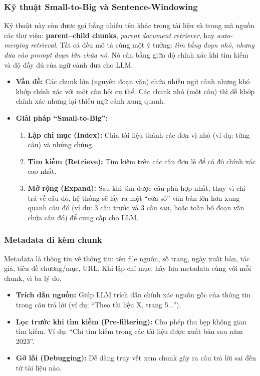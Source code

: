 \subsubsection{Kỹ thuật Small-to-Big và Sentence-Windowing}
\label{sssec:small_to_big}
Kỹ thuật này còn được gọi bằng nhiều tên khác trong tài liệu và trong mã nguồn các thư viện: \textbf{parent--child chunks}, \emph{parent document retriever}, hay \emph{auto-merging retrieval}. Tất cả đều mô tả cùng một ý tưởng: \emph{tìm bằng đoạn nhỏ, nhưng đưa vào prompt đoạn lớn chứa nó}.
Nó cân bằng giữa độ chính xác khi tìm kiếm và độ đầy đủ của ngữ cảnh đưa cho LLM.
\begin{itemize}
	\item \textbf{Vấn đề:} Các chunk lớn (nguyên đoạn văn) chứa nhiều ngữ cảnh nhưng khó khớp chính xác với một câu hỏi cụ thể. Các chunk nhỏ (một câu) thì dễ khớp chính xác nhưng lại thiếu ngữ cảnh xung quanh.
	\item \textbf{Giải pháp “Small-to-Big”:}
	\begin{enumerate}
		\item \textbf{Lập chỉ mục (Index):} Chia tài liệu thành các đơn vị nhỏ (ví dụ: từng câu) và nhúng chúng.
		\item \textbf{Tìm kiếm (Retrieve):} Tìm kiếm trên các câu đơn lẻ để có độ chính xác cao nhất.
		\item \textbf{Mở rộng (Expand):} Sau khi tìm được câu phù hợp nhất, thay vì chỉ trả về câu đó, hệ thống sẽ lấy ra một “cửa sổ” văn bản lớn hơn xung quanh câu đó (ví dụ: 3 câu trước và 3 câu sau, hoặc toàn bộ đoạn văn chứa câu đó) để cung cấp cho LLM.
	\end{enumerate}
\end{itemize}

\subsubsection{Metadata đi kèm chunk}
Metadata là thông tin về thông tin: tên file nguồn, số trang, ngày xuất bản, tác giả, tiêu đề chương/mục, URL. Khi lập chỉ mục, hãy lưu metadata cùng với mỗi chunk, vì ba lý do.
\begin{itemize}
	\item \textbf{Trích dẫn nguồn:} Giúp LLM trích dẫn chính xác nguồn gốc của thông tin trong câu trả lời (ví dụ: “Theo tài liệu X, trang 5...”).
	\item \textbf{Lọc trước khi tìm kiếm (Pre-filtering):} Cho phép thu hẹp không gian tìm kiếm. Ví dụ: “Chỉ tìm kiếm trong các tài liệu được xuất bản sau năm 2023”.
	\item \textbf{Gỡ lỗi (Debugging):} Dễ dàng truy vết xem chunk gây ra câu trả lời sai đến từ tài liệu nào.
\end{itemize}

